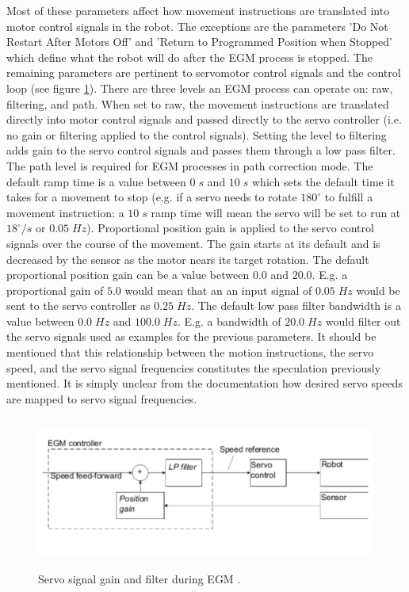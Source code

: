 \documentclass{cslthse-msc}
\begin{document}
Most of these parameters affect how movement instructions are translated into motor control signals in the robot. The exceptions are the parameters 'Do Not Restart After Motors Off' and 'Return to Programmed Position when Stopped' which define what the robot will do after the EGM process is stopped. The remaining parameters are pertinent to servomotor control signals and the control loop (see figure \ref{fig:lp_filter}). There are three levels an EGM process can operate on: raw, filtering, and path. When set to raw, the movement instructions are translated directly into motor control signals and passed directly to the servo controller (i.e. no gain or filtering applied to the control signals). Setting the level to filtering adds gain to the servo control signals and passes them through a low pass filter. The path level is required for EGM processes in path correction mode. The default ramp time is a value between $0 \; s$ and $10 \; s$ which sets the default time it takes for a movement to stop (e.g. if a servo needs to rotate $180^{\circ}$ to fulfill a movement instruction: a $10 \; s$ ramp time will mean the servo will be set to run at $18^{\circ}/s$ or $0.05 \; Hz$). Proportional position gain is applied to the servo control signals over the course of the movement. The gain starts at its default and is decreased by the sensor as the motor nears its target rotation. The default proportional position gain can be a value between $0.0$ and $20.0$. E.g. a proportional gain of $5.0$ would mean that an an input signal of $0.05 \; Hz$ would be sent to the servo controller as $0.25 \; Hz$. The default low pass filter bandwidth is a value between $0.0 \; Hz$ and $100.0 \; Hz$. E.g. a bandwidth of $20.0 \; Hz$ would filter out the servo signals used as examples for the previous parameters. It should be mentioned that this relationship between the motion instructions, the servo speed, and the servo signal frequencies constitutes the speculation previously mentioned. It is simply unclear from the documentation how desired servo speeds are mapped to servo signal frequencies. \par

\begin{figure}[H]
\vspace{0.5cm}
    \centering
    \includegraphics[width=12cm, height=5cm]{LP_filter_fig.png}
    \caption{Servo signal gain and filter during EGM \cite[Sec. 9.3.2.5]{ABB:controller_software}.}
    \label{fig:lp_filter}
\end{figure}
\end{document}
